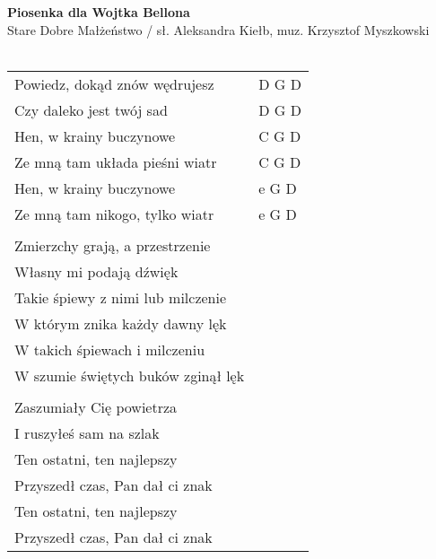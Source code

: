 \documentclass[a5paper]{article}
\begin{document}


\noindent
\fontsize{12pt}{15pt}\selectfont
\textbf{Piosenka dla Wojtka Bellona} \\
\fontsize{8pt}{10pt}\selectfont
Stare Dobre Małżeństwo / sł. Aleksandra Kiełb, muz. Krzysztof Myszkowski \\ \\
\fontsize{10pt}{12pt}\selectfont
{}
\begin{tabular}{@{}p{7.50cm}p{3cm}@{}}
\noindent
Powiedz, dokąd znów wędrujesz & D G D \\
Czy daleko jest twój sad & D G D \\
Hen, w krainy buczynowe & C G D \\
Ze mną tam układa pieśni wiatr & C G D \\
Hen, w krainy buczynowe & e G D \\
Ze mną tam nikogo, tylko wiatr & e G D \\ \\
 
Zmierzchy grają, a przestrzenie\\
Własny mi podają dźwięk\\
Takie śpiewy z nimi lub milczenie\\
W którym znika każdy dawny lęk\\
W takich śpiewach i milczeniu\\
W szumie świętych buków zginął lęk\\\\
 
Zaszumiały Cię powietrza\\
I ruszyłeś sam na szlak\\
Ten ostatni, ten najlepszy\\
Przyszedł czas, Pan dał ci znak\\
Ten ostatni, ten najlepszy\\
Przyszedł czas, Pan dał ci znak
\end{tabular}
\end{document}
